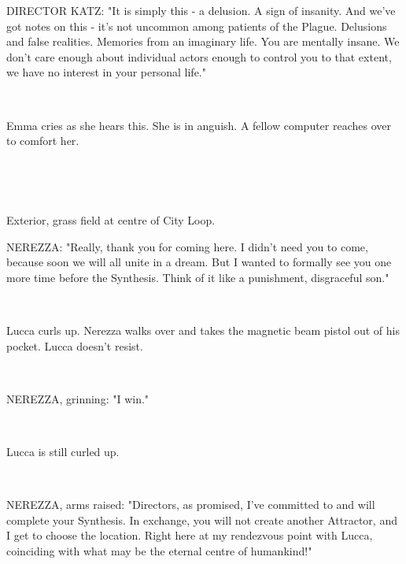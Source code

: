 \documentclass[11pt]{article}
\begin{document}
DIRECTOR KATZ: "It is simply this - a delusion.
A sign of insanity.
And we've got notes on this - it's not uncommon among patients of the Plague.
Delusions and false realities.
Memories from an imaginary life.
You are mentally insane.
We don't care enough about individual actors enough to control you to that extent, we have no interest in your personal life."

\ 

Emma cries as she hears this. 
She is in anguish.
A fellow computer reaches over to comfort her.

\ 

\ 

Exterior, grass field at centre of City Loop.

NEREZZA: "Really, thank you for coming here.
I didn't need you to come, because soon we will all unite in a dream. 
But I wanted to formally see you one more time before the Synthesis.
Think of it like a punishment, disgraceful son."

\ 

Lucca curls up.
Nerezza walks over and takes the magnetic beam pistol out of his pocket.
Lucca doesn't resist.

\ 

NEREZZA, grinning: "I win."

\ 

Lucca is still curled up.

\ 

NEREZZA, arms raised: "Directors, as promised, I've committed to and will complete your Synthesis.
In exchange, you will not create another Attractor, and I get to choose the location.
Right here at my rendezvous point with Lucca, coinciding with what may be the eternal centre of humankind!"
\end{document}

